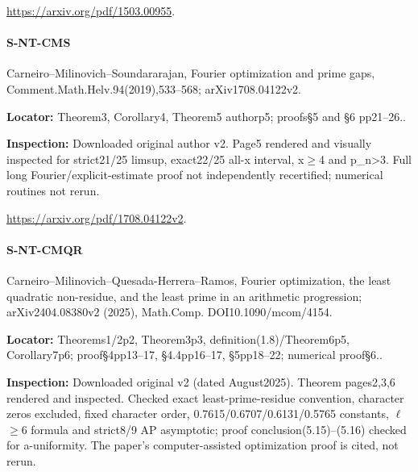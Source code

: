 \documentclass[11pt,a4paper]{article}
\begin{document}
\url{https://arxiv.org/pdf/1503.00955}.

\paragraph{S-NT-CMS} Carneiro–\allowbreak{}Milinovich–\allowbreak{}Soundararajan, Fourier optimization and prime gaps, Comment.\allowbreak{}Math.\allowbreak{}Helv.\allowbreak{}94(2019),533–\allowbreak{}568; arXiv1708.\allowbreak{}04122v2.

\textbf{Locator:} Theorem3, Corollary4, Theorem5 authorp5; proofs§5 and §6 pp21–\allowbreak{}26.\allowbreak{}.

\textbf{Inspection:} Downloaded original author v2.\allowbreak{} Page5 rendered and visually inspected for strict21/\allowbreak{}25 limsup, exact22/\allowbreak{}25 all-x interval, x\ensuremath{\ge}4 and p\_\allowbreak{}n>3.\allowbreak{} Full long Fourier/\allowbreak{}explicit-estimate proof not independently recertified; numerical routines not rerun.\allowbreak{}

\url{https://arxiv.org/pdf/1708.04122v2}.

\paragraph{S-NT-CMQR} Carneiro–\allowbreak{}Milinovich–\allowbreak{}Quesada-Herrera–\allowbreak{}Ramos, Fourier optimization, the least quadratic non-residue, and the least prime in an arithmetic progression; arXiv2404.\allowbreak{}08380v2 (2025), Math.\allowbreak{}Comp.\allowbreak{} DOI10.\allowbreak{}1090/\allowbreak{}mcom/\allowbreak{}4154.

\textbf{Locator:} Theorems1/\allowbreak{}2p2, Theorem3p3, definition(1.\allowbreak{}8)/\allowbreak{}Theorem6p5, Corollary7p6; proof§4pp13–\allowbreak{}17, §4.\allowbreak{}4pp16–\allowbreak{}17, §5pp18–\allowbreak{}22; numerical proof§6.\allowbreak{}.

\textbf{Inspection:} Downloaded original v2 (dated August2025).\allowbreak{} Theorem pages2,3,6 rendered and inspected.\allowbreak{} Checked exact least-prime-residue convention, character zeros excluded, fixed character order, 0.\allowbreak{}7615/\allowbreak{}0.\allowbreak{}6707/\allowbreak{}0.\allowbreak{}6131/\allowbreak{}0.\allowbreak{}5765 constants, \ensuremath{\ell}\ensuremath{\ge}6 formula and strict8/\allowbreak{}9 AP asymptotic; proof conclusion(5.\allowbreak{}15)–\allowbreak{}(5.\allowbreak{}16) checked for a-uniformity.\allowbreak{} The paper’s computer-assisted optimization proof is cited, not rerun.\allowbreak{}
\end{document}
